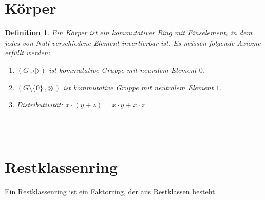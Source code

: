 \documentclass{scrreprt}
\newtheorem{definition}{Definition}[section]
\theoremstyle{remark}
\begin{document}
\section{Körper}
\begin{definition}
  Ein Körper ist ein kommutativer Ring mit Einselement, in dem jedes von Null verschiedene Element invertierbar ist. Es müssen folgende Axiome erfüllt werden:
  \begin{enumerate}
  \item $(G\,,\oplus\,)$ ist kommutative Gruppe mit neuralem Element $0$.
  \item $(G\setminus\lbrace0\rbrace\,,\otimes\,)$ ist kommutative Gruppe mit neutralem Element $1$.
  \item Distributivität: $x\cdot(y+z) = x\cdot y+x\cdot z$
  \end{enumerate}
\end{definition}
\hrulefill\\\\

\section{Restklassenring}
Ein Restklassenring ist ein Faktorring, der aus Restklassen besteht.
\end{document}
